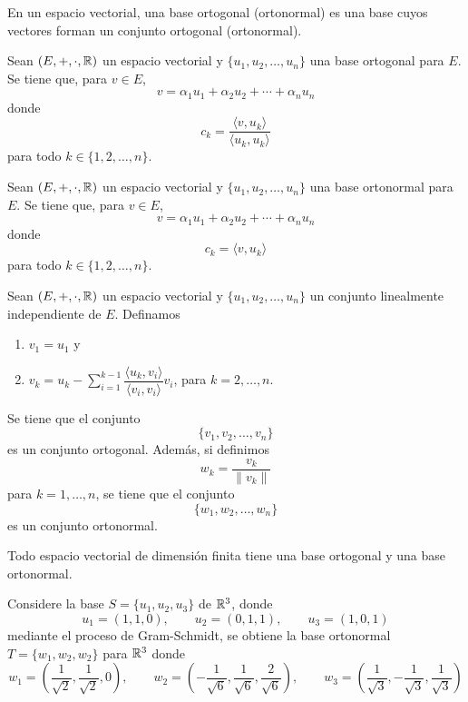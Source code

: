 \documentclass[a4,11pt]{aleph-notas}
\begin{document}
\begin{defi}
    En un espacio vectorial, una base ortogonal (ortonormal) es una base cuyos vectores forman un conjunto ortogonal (ortonormal). 
\end{defi}

\begin{teo}
    Sean $(E,+,\cdot,\mathbb{R})$ un espacio vectorial y $\{u_1, u_2, \ldots, u_n\}$ una base ortogonal para $E$. Se tiene que, para $v \in E$,
    \[
        v = \alpha_1 u_1 + \alpha_2 u_2 +\cdots + \alpha_n u_n
    \]
    donde
    \[
        c_k = \dfrac{\langle v, u_k \rangle}{\langle u_k, u_k \rangle}
    \]
    para todo $k \in \{1, 2, \ldots, n\}$.
\end{teo}


\begin{teo}
    Sean $(E,+,\cdot,\mathbb{R})$ un espacio vectorial y $\{u_1, u_2, \ldots, u_n\}$ una base ortonormal para $E$. Se tiene que, para $v \in E$,
    \[
        v = \alpha_1 u_1 + \alpha_2 u_2 +\cdots + \alpha_n u_n
    \]
    donde
    \[
        c_k = \langle v, u_k \rangle 
    \]
    para todo $k \in \{1, 2, \ldots, n\}$.
\end{teo}


\begin{teo}
    Sean $(E,+,\cdot,\mathbb{R})$ un espacio vectorial y $\{u_1, u_2, \ldots, u_n\}$ un conjunto linealmente independiente de $E$. Definamos
    \begin{enumerate}
    \item 
        $v_1 = u_1$ y
    \item
        $\displaystyle v_k = 
            u_k 
            - \sum_{i=1}^{k-1} \dfrac{\langle u_k, v_i\rangle}{\langle v_i,v_i\rangle} v_i$, para $k=2,\ldots,n$.
    \end{enumerate}
    Se tiene que el conjunto
    \[
        \{v_1, v_2, \ldots, v_n\}
    \]
    es un conjunto ortogonal. Además, si definimos
    \[
        w_k = \dfrac{v_k}{\|v_k\|}
    \]
    para $k=1,\ldots,n$, se tiene que el conjunto
    \[
        \{w_1, w_2, \ldots, w_n\}
    \]
    es un conjunto ortonormal.
\end{teo}


\begin{teo}
    Todo espacio vectorial de dimensión finita tiene una base ortogonal y una base ortonormal.
\end{teo}


\begin{ejem}
    Considere la base $S = \{u_1, u_2, u_3\}$ de $\mathbb{R}^3$, donde 
    \[
        u_1 = (1,1,0), \qquad u_2 = (0, 1,1), \qquad u_3 = (1,0,1)
    \]
    mediante el proceso de Gram-Schmidt, se obtiene la base ortonormal $T=\{w_1, w_2, w_2\}$ para $\mathbb{R}^3$ donde
    \[
        w_1 = \left(\dfrac{1}{\sqrt{2}},\dfrac{1}{\sqrt{2}},0\right), \qquad
        w_2 = \left(-\dfrac{1}{\sqrt{6}},\dfrac{1}{\sqrt{6}},
        \dfrac{2}{\sqrt{6}}\right), \qquad
        w_3 = \left(\dfrac{1}{\sqrt{3}},-\dfrac{1}{\sqrt{3}},
        \dfrac{1}{\sqrt{3}}\right)
    \]
\end{ejem}
\end{document}
